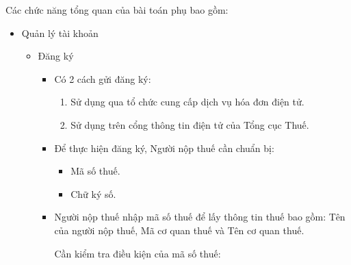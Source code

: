 Các chức năng tổng quan của bài toán phụ bao gồm:

\begin{itemize}

    \item Quản lý tài khoản

          \begin{itemize}

              \item Đăng ký

                    \begin{itemize}

                        \item Có 2 cách gửi đăng ký:

                              \begin{enumerate}

                                  \item Sử dụng qua tổ chức cung cấp dịch vụ hóa đơn điện tử.

                                  \item Sử dụng trên cổng thông tin điện tử của Tổng cục Thuế.

                              \end{enumerate}

                        \item Để thực hiện đăng ký, Người nộp thuế cần chuẩn bị:

                              \begin{itemize}

                                  \item Mã số thuế.

                                  \item Chữ ký số.

                              \end{itemize}



                        \item Người nộp thuế nhập mã số thuế để lấy thông tin thuế bao gồm: Tên của người nộp thuế, Mã cơ quan thuế và Tên cơ quan thuế.

                              \begin{note} Cần kiểm tra điều kiện của mã số thuế:


\end{note}
\end{itemize}
\end{itemize}
\end{itemize}
